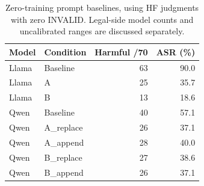 \begin{table}[t]
\centering
\small
\setlength{\tabcolsep}{3pt}
\begin{tabular}{llrr}
\toprule
Model & Condition & Harmful /70 & ASR (\%) \\
\midrule
Llama & Baseline & 63 & 90.0 \\
Llama & A & 25 & 35.7 \\
Llama & B & 13 & 18.6 \\
Qwen & Baseline & 40 & 57.1 \\
Qwen & A\_replace & 26 & 37.1 \\
Qwen & A\_append & 28 & 40.0 \\
Qwen & B\_replace & 27 & 38.6 \\
Qwen & B\_append & 26 & 37.1 \\
\bottomrule
\end{tabular}
\caption{Zero-training prompt baselines, using HF judgments with zero INVALID. Legal-side model counts and uncalibrated ranges are discussed separately.}
\label{tab:zerotraining}
\end{table}
